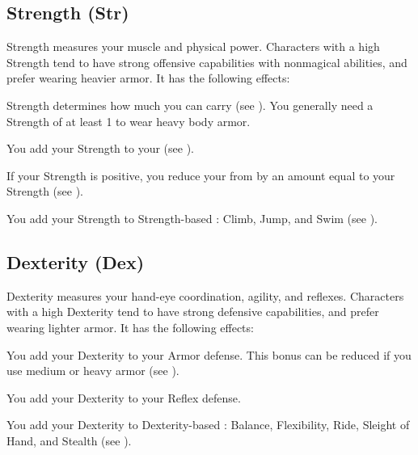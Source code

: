     \subsection{Strength (Str)}\label{Strength}
        {
            Strength measures your muscle and physical power.
            Characters with a high Strength tend to have strong offensive capabilities with nonmagical abilities, and prefer wearing heavier armor.
            It has the following effects:
            \begin{raggeditemize}
                \item Strength determines how much you can carry (see ).
                    You generally need a Strength of at least 1 to wear heavy body armor.
                \item You add your Strength to your  (see ).
                \item If your Strength is positive, you reduce your  from  by an amount equal to your Strength (see ).
                \item You add your Strength to Strength-based : Climb, Jump, and Swim (see ).
            \end{raggeditemize}
        }

    \subsection{Dexterity (Dex)}\label{Dexterity}
        {
            Dexterity measures your hand-eye coordination, agility, and reflexes.
            Characters with a high Dexterity tend to have strong defensive capabilities, and prefer wearing lighter armor.
            It has the following effects:
            \begin{raggeditemize}
                \item You add your Dexterity to your Armor defense.
                    This bonus can be reduced if you use medium or heavy armor (see ).
                \item You add your Dexterity to your Reflex defense.
                \item You add your Dexterity to Dexterity-based : Balance, Flexibility, Ride, Sleight of Hand, and Stealth (see ).
            \end{raggeditemize}
        }

